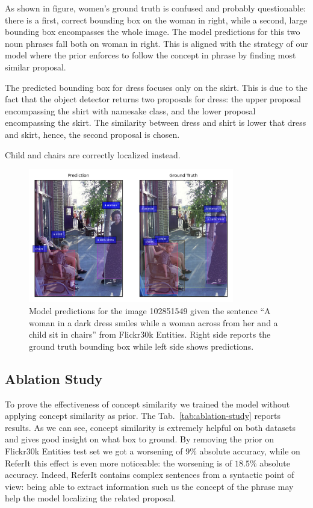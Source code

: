 As shown in figure, women's ground truth is confused and probably
questionable: there is a first, correct bounding box on the woman in
right, while a second, large bounding box encompasses the whole image.
The model predictions for this two noun phrases fall both on woman in
right. This is aligned with the strategy of our model where the prior
enforces to follow the concept in phrase by finding most similar
proposal.

The predicted bounding box for dress focuses only on the skirt. This
is due to the fact that the object detector returns two proposals for
dress: the upper proposal encompassing the shirt with namesake class,
and the lower proposal encompassing the skirt. The similarity between
dress and shirt is lower that dress and skirt, hence, the second
proposal is chosen.

Child and chairs are correctly localized instead.

\begin{figure}
  \centering
  \includegraphics[width=0.8\textwidth]{figures/similing-woman.png}
  \caption[Model predictions for the image 102851549 from Flickr30k
    Entities]{ Model predictions for the image 102851549 given the
    sentence ``A woman in a dark dress smiles while a woman across
    from her and a child sit in chairs'' from Flickr30k Entities.
    Right side reports the ground truth bounding box while left side
    shows predictions.}
  \label{fig:qualitative-results}
\end{figure}

\subsection{Ablation Study}

To prove the effectiveness of concept similarity we trained the model
without applying concept similarity as prior. The
Tab.~\ref{tab:ablation-study} reports results. As we can see, concept
similarity is extremely helpful on both datasets and gives good
insight on what box to ground. By removing the prior on Flickr30k
Entities test set we got a worsening of $9\%$ absolute accuracy, while
on ReferIt this effect is even more noticeable: the worsening is of
$18.5\%$ absolute accuracy. Indeed, ReferIt contains complex sentences
from a syntactic point of view: being able to extract information such
us the concept of the phrase may help the model localizing the related
proposal.

